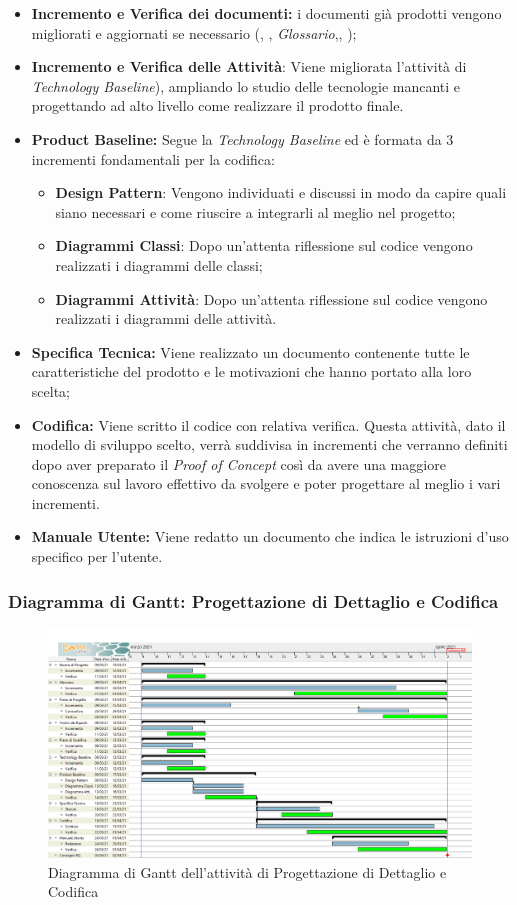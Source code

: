 \begin{itemize}
    \item \textbf{Incremento e Verifica dei documenti:} i documenti già prodotti vengono migliorati e aggiornati se necessario (\textit{\NdP}, \textit{\PdP}, \textit{Glossario},\textit{\PdQ}, \textit{\AdR}); 
    \item \textbf{Incremento e Verifica delle Attività}: Viene migliorata l'attività di \textit{Technology Baseline}), ampliando lo studio delle tecnologie mancanti e progettando ad alto livello come realizzare il prodotto finale.
    \item \textbf{Product Baseline:} Segue la \textit{Technology Baseline} ed è formata da 3 incrementi fondamentali per la codifica:
        \begin{itemize}
            \item \textbf{Design Pattern}: Vengono individuati e discussi in modo da capire quali siano necessari e come riuscire a integrarli al meglio nel progetto;
            \item \textbf{Diagrammi Classi}: Dopo un'attenta riflessione sul codice vengono realizzati i diagrammi delle classi;
            \item \textbf{Diagrammi Attività}: Dopo un'attenta riflessione sul codice vengono realizzati i diagrammi delle attività. 
        \end{itemize} 
    \item \textbf{Specifica Tecnica:} Viene realizzato un documento contenente tutte le caratteristiche del prodotto e le motivazioni che hanno portato alla loro scelta;
    \item \textbf{Codifica:} Viene scritto il codice con relativa verifica. Questa attività, dato il modello di sviluppo scelto, verrà suddivisa in incrementi che verranno definiti dopo aver preparato il \textit{Proof of Concept} così da avere una maggiore conoscenza sul lavoro effettivo da svolgere e poter progettare al meglio i vari incrementi.  
    \item \textbf{Manuale Utente:} Viene redatto un documento che indica le istruzioni d'uso specifico per l'utente.
\end{itemize}

\newpage
\subsubsection{Diagramma di Gantt: Progettazione di Dettaglio e Codifica}
\begin{figure}[ht]
    \centering
    \includegraphics[width=\textwidth]{Immagini/GanttProgettazioneDiDettaglioECodifica}
    \caption{Diagramma di Gantt dell'attività di Progettazione di Dettaglio e Codifica}
\end{figure}